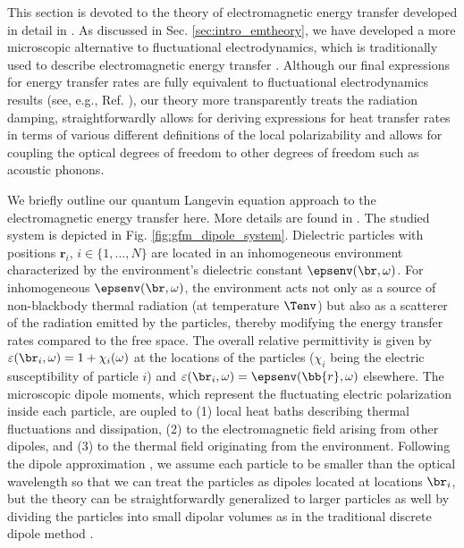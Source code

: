 This section is devoted to the theory of electromagnetic energy transfer developed in detail in . As discussed in Sec. \ref{sec:intro_emtheory}, we have developed a more microscopic alternative to fluctuational electrodynamics, which is traditionally used to describe electromagnetic energy transfer \cite{joulain05}. Although our final expressions for energy transfer rates are fully equivalent to fluctuational electrodynamics results (see, e.g., Ref. \cite{messina13}), our theory more transparently treats the radiation damping, straightforwardly allows for deriving expressions for heat transfer rates in terms of various different definitions of the local polarizability and allows for coupling the optical degrees of freedom to other degrees of freedom such as acoustic phonons.

We briefly outline our quantum Langevin equation approach to the electromagnetic energy transfer here. More details are found in . The studied system is depicted in Fig. \ref{fig:gfm_dipole_system}. Dielectric particles with positions $\mathbf{r}_i$, $i\in\{1,\dots,N\}$ are located in an inhomogeneous environment characterized by the environment's dielectric constant $\epsenv(\br,\omega)$. For inhomogeneous $\epsenv(\br,\omega)$, the environment acts not only as a source of non-blackbody thermal radiation (at temperature $\Tenv$) but also as a scatterer of the radiation emitted by the particles, thereby modifying the energy transfer rates compared to the free space. The overall relative permittivity is given by $\varepsilon(\br_i,\omega)=1+\chi_i(\omega)$ at the locations of the particles ($\chi_i$ being the electric susceptibility of particle $i$) and $\varepsilon(\br_i,\omega)=\epsenv(\bb{r},\omega)$ elsewhere. The microscopic dipole moments, which represent the fluctuating electric polarization inside each particle, are oupled to (1) local heat baths describing thermal fluctuations and dissipation, (2) to the electromagnetic field arising from other dipoles, and (3) to the thermal field originating from the environment. Following the dipole approximation \cite{novotny}, we assume each particle to be smaller than the optical wavelength so that we can treat the particles as dipoles located at locations $\br_i$, but the theory can be straightforwardly generalized to larger particles as well by dividing the particles into small dipolar volumes as in the traditional discrete dipole method \cite{novotny}. 


